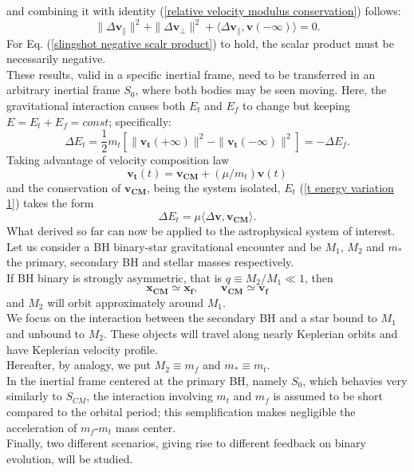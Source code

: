 \documentclass[12pt,twoside,openany]{book}
\begin{document}
and combining it with identity (\ref{relative velocity modulus conservation}) follows:
\begin{equation}\label{slingshot negative scalr product}
     \| \Delta\mathbf{v}_\parallel\|^2+  \| \Delta\mathbf{v}_\perp\|^2+\langle \Delta\mathbf{v}_\parallel, \mathbf{v}(-\infty) \rangle=0.
\end{equation}
For Eq. (\ref{slingshot negative scalr product}) to hold, the scalar product must be necessarily negative.\\These results, valid in a specific inertial frame, need to be transferred in an arbitrary inertial frame $S_0$, where both bodies may be seen moving. Here, the gravitational interaction causes both $E_t$ and $E_f$ to change but keeping $E=E_t+E_f=const$; specifically:
\begin{equation}\label{t energy variation 1}
    \Delta E_t=\frac{1}{2}m_t[\|\mathbf{v_t}(+\infty)\|^2-  \|\mathbf{v_t}(-\infty)\|^2]=-\Delta E_f.
\end{equation}
Taking advantage of velocity composition law
\begin{equation}
    \mathbf{v_t}(t)=\mathbf{v_{CM}}+(\mu/m_t)\mathbf{v}(t)
\end{equation}
and the conservation of $\mathbf{v_{CM}}$, being the system isolated, $E_t$ (\ref{t energy variation 1}) takes the form 
\begin{equation}
    \Delta E_t=\mu\langle \Delta\mathbf{v}, \mathbf{v_{CM}} \rangle.
\end{equation}
What derived so far can now be applied to the astrophysical system of interest.\\Let us consider a BH binary-star gravitational encounter and be $M_1$, $M_2$ and $m_*$ the primary, secondary BH and stellar masses respectively.\\If BH binary is strongly asymmetric, that is $q\equiv M_2/M_1\ll1$, then
\begin{equation}\label{Primary BH approx CM}
    \mathbf{x_{CM}}\simeq \mathbf{x_f}, \qquad\mathbf{v_{CM}}\simeq \mathbf{v_f}
\end{equation}
 and $M_2$ will orbit approximately around $M_1$.\\We focus on the interaction between the secondary BH and a star bound to $M_1$ and unbound to $M_2$. These objects will travel along nearly Keplerian orbits and have Keplerian velocity profile.\\Hereafter, by analogy, we put $M_2\equiv m_f$ and $m_*\equiv m_t$.\\In the inertial frame centered at the primary BH, namely $S_0$, which behavies very similarly to $S_{CM}$, the interaction involving $m_t$ and $m_f$ is assumed to be short compared to the orbital period; this semplification makes negligible the acceleration of $m_f$-$m_t$ mass center.\\Finally, two different scenarios, giving rise to different feedback on binary evolution, will be studied.
\end{document}
